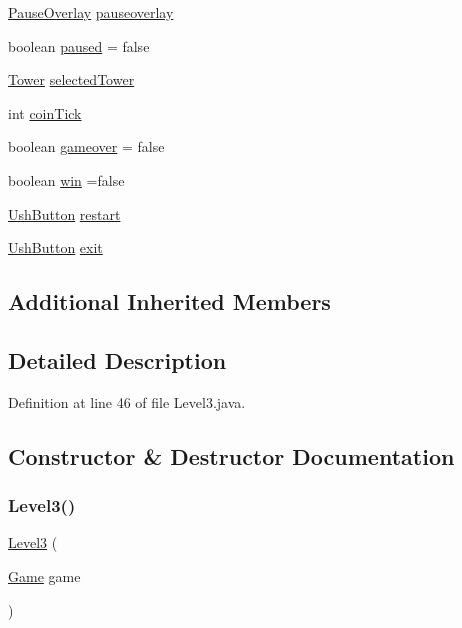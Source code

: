 \begin{DoxyCompactItemize}
\hyperlink{classui_1_1_pause_overlay}{Pause\+Overlay} \hyperlink{classscenes_1_1_level3_a544fb9294d892e35b4b0316e07997cd6}{pauseoverlay}
\item 
boolean \hyperlink{classscenes_1_1_level3_aa1e43f4bcbc826434b83c0f3ec507143}{paused} = false
\item 
\hyperlink{classtowers_1_1_tower}{Tower} \hyperlink{classscenes_1_1_level3_af6b1162bc2f00f8d549aae075ddd5a8b}{selected\+Tower}
\item 
int \hyperlink{classscenes_1_1_level3_aa48bc6c9a2648651d6484c9063ca1b8f}{coin\+Tick}
\item 
boolean \hyperlink{classscenes_1_1_level3_a962cec751fe966ea7bf381c68ab5c70f}{gameover} = false
\item 
boolean \hyperlink{classscenes_1_1_level3_a1cc7b399bb950a160021766cd9a126f8}{win} =false
\item 
\hyperlink{classui_1_1_ush_button}{Ush\+Button} \hyperlink{classscenes_1_1_level3_ac1d34384911014e49613ccfb1abddbcc}{restart}
\item 
\hyperlink{classui_1_1_ush_button}{Ush\+Button} \hyperlink{classscenes_1_1_level3_a08590df28bf721b1cf1670cf0f8f7341}{exit}
\end{DoxyCompactItemize}
\subsection*{Additional Inherited Members}


\subsection{Detailed Description}


Definition at line 46 of file Level3.\+java.



\subsection{Constructor \& Destructor Documentation}
\mbox{\label{classscenes_1_1_level3_a0f56949b20e6eda500c5b9c50e16de58}} 
\subsubsection{\texorpdfstring{Level3()}{Level3()}}
{\footnotesize\ttfamily \hyperlink{classscenes_1_1_level3}{Level3} (\begin{DoxyParamCaption}\item[{\hyperlink{classprogetto_1_1_game}{Game}}]{game }\end{DoxyParamCaption})}



